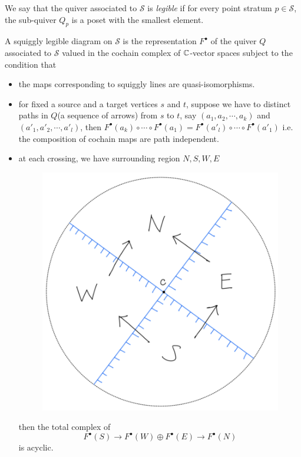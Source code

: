 \begin{definition}
We say that the quiver associated to $\mathcal{S}$ is \emph{legible} if 
for every point stratum $p\in \mathcal{S}$, the sub-quiver $Q_p$ is a poset with the smallest element.
\end{definition}

\begin{definition}
A squiggly legible diagram on $\mathcal{S}$ is the representation $F^\bullet$ of the quiver $Q$ associated to $\mathcal{S}$ valued in the cochain complex of $\mathbb{C}$-vector spaces subject to the condition that
\begin{itemize}
\item the maps corresponding to squiggly lines are quasi-isomorphisms.

\item for fixed a source and a target vertices $s$ and $t$, suppose we have to distinct paths in $Q$(a sequence of arrows) from $s$ to $t$, say $(a_1,a_2,\cdots,a_k)$ and $(a'_1,a'_2,\cdots,a'_l)$, then $F^\bullet(a_k)\circ \cdots \circ F^\bullet(a_1) = F^\bullet(a'_l)\circ \cdots \circ F^\bullet(a'_1)$ i.e. the composition of cochain maps are path independent.

\item at each crossing, we have surrounding region $N,S,W,E$
\begin{figure}[H] 
    \centering
    \includegraphics[scale = 0.55]{diagrams/intro/2.png}
    \caption{}
    \label{fig:your-label}
\end{figure}
then the total complex of 
\[
F^\bullet(S) \rightarrow F^\bullet(W)\oplus F^\bullet(E) \rightarrow F^\bullet(N)
\]
is acyclic.
\end{itemize}
\end{definition}
